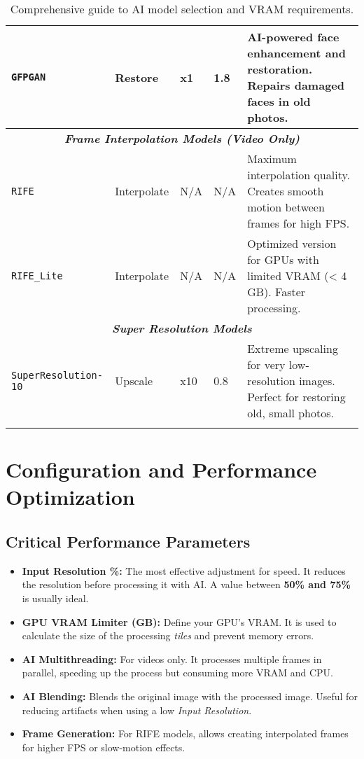 \documentclass[11pt, a4paper]{article}
\begin{document}
\begin{longtable}{p{2.8cm} p{1.8cm} p{1.2cm} p{1.5cm} p{7.2cm}}
\midrule
\texttt{GFPGAN} & Restore & x1 & 1.8 & AI-powered face enhancement and restoration. Repairs damaged faces in old photos. \\
\midrule
\multicolumn{5}{c}{\textit{\textbf{Frame Interpolation Models (Video Only)}}} \\
\midrule
\texttt{RIFE} & Interpolate & N/A & N/A & Maximum interpolation quality. Creates smooth motion between frames for high FPS. \\
\texttt{RIFE\_Lite} & Interpolate & N/A & N/A & Optimized version for GPUs with limited VRAM (< 4 GB). Faster processing. \\
\midrule
\multicolumn{5}{c}{\textit{\textbf{Super Resolution Models}}} \\
\midrule
\texttt{SuperResolution-10} & Upscale & x10 & 0.8 & Extreme upscaling for very low-resolution images. Perfect for restoring old, small photos. \\
\bottomrule
\caption{Comprehensive guide to AI model selection and VRAM requirements.}
\label{tab:modelos}
\end{longtable}


\section{Configuration and Performance Optimization}

\subsection{Critical Performance Parameters}
\begin{itemize}[leftmargin=*]
    \item \textbf{Input Resolution \%:} The most effective adjustment for speed. It reduces the resolution before processing it with AI. A value between \textbf{50\% and 75\%} is usually ideal.
    \item \textbf{GPU VRAM Limiter (GB):} Define your GPU's VRAM. It is used to calculate the size of the processing \textit{tiles} and prevent memory errors.
    \item \textbf{AI Multithreading:} For videos only. It processes multiple frames in parallel, speeding up the process but consuming more VRAM and CPU.
    \item \textbf{AI Blending:} Blends the original image with the processed image. Useful for reducing artifacts when using a low \textit{Input Resolution}.
    \item \textbf{Frame Generation:} For RIFE models, allows creating interpolated frames for higher FPS or slow-motion effects.
\end{itemize}
\end{document}
